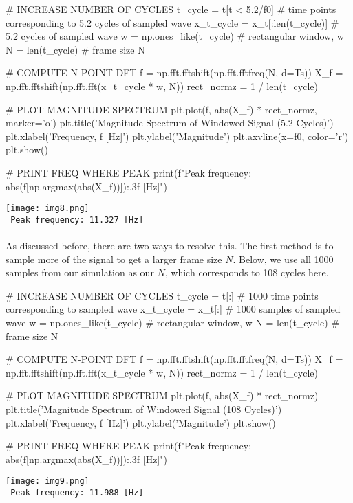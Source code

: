 \documentclass{report}
\begin{document}
\begin{python}
# INCREASE NUMBER OF CYCLES
t_cycle = t[t < 5.2/f0]                # time points corresponding to 5.2 cycles of sampled wave
x_t_cycle = x_t[:len(t_cycle)]         # 5.2 cycles of sampled wave
w = np.ones_like(t_cycle)              # rectangular window, w
N = len(t_cycle)                       # frame size N

# COMPUTE N-POINT DFT   
f = np.fft.fftshift(np.fft.fftfreq(N, d=Ts))
X_f = np.fft.fftshift(np.fft.fft(x_t_cycle * w, N))  
rect_normz = 1 / len(t_cycle)          

# PLOT MAGNITUDE SPECTRUM
plt.plot(f, abs(X_f) * rect_normz, marker='o')
plt.title('Magnitude Spectrum of Windowed Signal (5.2-Cycles)')
plt.xlabel('Frequency, f [Hz]')
plt.ylabel('Magnitude')
plt.axvline(x=f0, color='r')
plt.show()

# PRINT FREQ WHERE PEAK
print(f"Peak frequency: {abs(f[np.argmax(abs(X_f))]):.3f} [Hz]")
\end{python}
\texttt{[image: img8.png]} \\ 
\texttt{ Peak frequency: 11.327 [Hz]} 
\\ \\
As discussed before, there are two ways to resolve this. The first method is to sample more of the signal 
to get a larger frame size $N$. Below, we use all 1000 samples from our simulation as our $N$, which corresponds 
to 108 cycles here.
\begin{python}
# INCREASE NUMBER OF CYCLES
t_cycle = t[:]                         # 1000 time points corresponding to sampled wave
x_t_cycle = x_t[:]                     # 1000 samples of sampled wave
w = np.ones_like(t_cycle)              # rectangular window, w
N = len(t_cycle)                       # frame size N

# COMPUTE N-POINT DFT                
f = np.fft.fftshift(np.fft.fftfreq(N, d=Ts))
X_f = np.fft.fftshift(np.fft.fft(x_t_cycle * w, N))  
rect_normz = 1 / len(t_cycle)          

# PLOT MAGNITUDE SPECTRUM
plt.plot(f, abs(X_f) * rect_normz)
plt.title('Magnitude Spectrum of Windowed Signal (108 Cycles)')
plt.xlabel('Frequency, f [Hz]')
plt.ylabel('Magnitude')
plt.show()

# PRINT FREQ WHERE PEAK
print(f"Peak frequency: {abs(f[np.argmax(abs(X_f))]):.3f} [Hz]")
\end{python}
\texttt{[image: img9.png]} \\ 
\texttt{ Peak frequency: 11.988 [Hz]}
\end{document}
